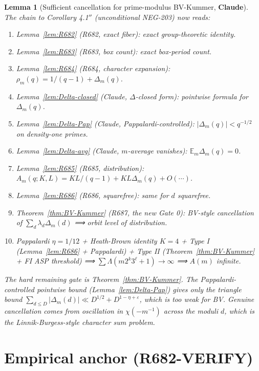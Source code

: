 \documentclass[12pt]{amsart}
\newtheorem{lemma}{Lemma}
\theoremstyle{definition}
\theoremstyle{remark}
\begin{document}
\begin{lemma}[Sufficient cancellation for prime-modulus BV-Kummer, \textbf{Claude}]
The chain to Corollary 4.1$''$ (unconditional NEG-203) now reads:

\begin{enumerate}
\item Lemma~\ref{lem:R682} (R682, exact fiber): exact group-theoretic identity.
\item Lemma~\ref{lem:R683} (R683, box count): exact box-period count.
\item Lemma~\ref{lem:R684} (R684, character expansion): $\rho_m(q) = 1/(q-1) + \Delta_m(q)$.
\item Lemma~\ref{lem:Delta-closed} (Claude, $\Delta$-closed form): pointwise formula for $\Delta_m(q)$.
\item Lemma~\ref{lem:Delta-Pap} (Claude, Pappalardi-controlled): $|\Delta_m(q)| < q^{-1/2}$ on density-one primes.
\item Lemma~\ref{lem:Delta-avg} (Claude, $m$-average vanishes): $\mathbb{E}_m \Delta_m(q) = 0$.
\item Lemma~\ref{lem:R685} (R685, distribution): $A_m(q; K, L) = KL/(q-1) + KL \Delta_m(q) + O(\cdots)$.
\item Lemma~\ref{lem:R686} (R686, squarefree): same for $d$ squarefree.
\item Theorem~\ref{thm:BV-Kummer} (R687, the new Gate 0): BV-style cancellation of $\sum_d \lambda_d \Delta_m(d)$ ⟹ orbit level of distribution.
\item Pappalardi $\eta = 1/12$ + Heath-Brown identity $K = 4$ + Type I (Lemma~\ref{lem:R686} + Pappalardi) + Type II (Theorem~\ref{thm:BV-Kummer} + FI ASP threshold) ⟹ $\sum \Lambda(m 2^k 3^\ell + 1) \to \infty$ ⟹ $A(m)$ infinite.
\end{enumerate}

The hard remaining gate is Theorem~\ref{thm:BV-Kummer}. The Pappalardi-controlled pointwise
bound (Lemma~\ref{lem:Delta-Pap}) gives only the triangle bound
$\sum_{d \le D} |\Delta_m(d)| \ll D^{1/2} + D^{1-\eta+\varepsilon}$, which is too weak for BV.
Genuine cancellation comes from oscillation in $\chi(-m^{-1})$ across the moduli $d$, which
is the Linnik-Burgess-style character sum problem.

\section{Empirical anchor (R682-VERIFY)}


\end{lemma}
\end{document}
